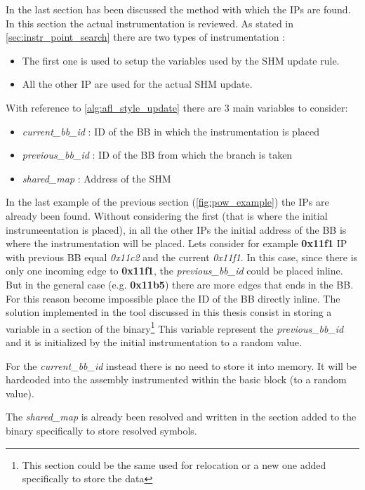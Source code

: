 In the last section has been discussed the method with which the \gls{IP}s are found.
In this section the actual instrumentation is reviewed.
As stated in \cref{sec:instr_point_search} there are two types of instrumentation :
\begin{itemize}
    \item The first one is used to setup the variables used by the \gls{SHM} update rule.
    \item All the other \gls{IP} are used for the actual \gls{SHM} update.
\end{itemize}
With reference to \cref{alg:afl_style_update} there are 3 main variables to consider:
\begin{itemize}
    \item \textit{current\_bb\_id} : ID of the \gls{BB} in which the instrumentation is placed
    \item \textit{previous\_bb\_id} : ID of the \gls{BB} from which the branch is taken
    \item \textit{shared\_map} : Address of the \gls{SHM}
\end{itemize}
In the last example of the previous section (\cref{fig:pow_example}) the \gls{IP}s are already been found.
Without considering the first (that is where the initial instrumeentation is placed), in all the other \gls{IP}s the 
initial address of the \gls{BB} is where the instrumentation will be placed.
Lets consider for example \textbf{0x11f1} \gls{IP} with previous \gls{BB} equal \textit{0x11c2} and the current \textit{0x11f1}.
In this case, since there is only one incoming edge to \textbf{0x11f1}, the \textit{previous\_bb\_id} could be placed inline.
But in the general case (e.g. \textbf{0x11b5}) there are more edges that ends in the \gls{BB}. For this reason become impossible 
place the ID of the \gls{BB} directly inline.
The solution implemented in the tool discussed in this thesis consist in storing a variable in a section of the binary\footnote{
    This section could be the same used for relocation or a new one added specifically to store the data
}
This variable represent the \textit{previous\_bb\_id} and it is initialized by the initial instrumentation to a random value.

For the \textit{current\_bb\_id} instead there is no need to store it into memory. It will be hardcoded into the 
assembly instrumented within the basic block (to a random value).

The \textit{shared\_map} is already been resolved and written in the section added to the binary specifically to store 
resolved symbols.

